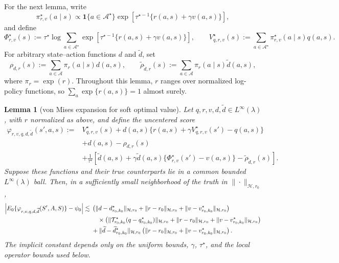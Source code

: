 \documentclass[11pt]{article}
\theoremstyle{plain}
\newtheorem{lemma}[theorem]{Lemma}
\begin{document}
 



For the next lemma, write
\[
\pi_{r,v}^\star(a\mid s)
\propto
\mathbf 1\{a\in\mathcal A^\star\}
\exp\!\left[\tau^{\star-1}\{r(a,s)+\gamma v(a,s)\}\right],
\]
and define
\[
\Phi_{r,v}^\star(s)
:=\tau^\star\log\!\sum_{a\in\mathcal A^\star}
\exp\!\left[\tau^{\star-1}\{r(a,s)+\gamma v(a,s)\}\right],
\qquad
V_{q,r,v}^\star(s)
:=\sum_{a\in\mathcal A^\star}\pi_{r,v}^\star(a\mid s)q(a,s).
\]
For arbitrary state--action functions \(d\) and \(\widetilde d\), set
\[
\rho_{d,r}(s):=\sum_{a\in\mathcal A}\pi_r(a\mid s)d(a,s),
\qquad
\widetilde\rho_{\widetilde d,r}(s)
:=\sum_{a\in\mathcal A}\pi_r(a\mid s)\widetilde d(a,s),
\]
where \(\pi_r=\exp(r)\). Throughout this lemma, \(r\) ranges over normalized
log-policy functions, so \(\sum_a\exp\{r(a,s)\}=1\) almost surely.

\begin{lemma}[von Mises expansion for soft optimal value]
\label{lemma::vonmises_softstar}
Let \(q,r,v,d,\widetilde d\in L^\infty(\lambda)\), with \(r\) normalized as
above, and define the
uncentered score
\begin{align*}
\varphi_{r,v,q,d,\widetilde d}(s',a,s)
:={}&V_{q,r,v}^\star(s)
+d(a,s)\{r(a,s)+\gamma V_{q,r,v}^\star(s')-q(a,s)\}\\
&+d(a,s)-\rho_{d,r}(s)\\
&+\frac{1}{\tau^\star}\left[
\widetilde d(a,s)
+\gamma\widetilde d(a,s)\{\Phi_{r,v}^\star(s')-v(a,s)\}
-\widetilde\rho_{\widetilde d,r}(s)
\right].
\end{align*}
Suppose these functions and their true counterparts lie in a common bounded
\(L^\infty(\lambda)\) ball. Then, in a sufficiently small neighborhood of the
truth in \(\|\cdot\|_{\mathcal H,r_0}\),
\begin{align}
\left|E_0\{\varphi_{r,v,q,d,\widetilde d}(S',A,S)\}-\psi_0\right|
\lesssim{}&
\left(
\|d-d_{r_0,k_0}^\star\|_{\mathcal H,r_0}
+\|r-r_0\|_{\mathcal H,r_0}
+\|v-v_{r_0,k_0}^\star\|_{\mathcal H,r_0}
\right)\notag\\
&\quad\times
\left(
\|\mathcal T_{r_0,k_0}^\star(q-q_{r_0,k_0}^\star)\|_{\mathcal H,r_0}
+\|r-r_0\|_{\mathcal H,r_0}
+\|v-v_{r_0,k_0}^\star\|_{\mathcal H,r_0}
\right)\notag\\
&+
\|\widetilde d-\widetilde d_{r_0,k_0}^\star\|_{\mathcal H,r_0}
\left(
\|r-r_0\|_{\mathcal H,r_0}
+\|v-v_{r_0,k_0}^\star\|_{\mathcal H,r_0}
\right).
\label{eq:softstar-vm-total}
\end{align}
The implicit constant depends only on the uniform bounds, \(\gamma\),
\(\tau^\star\), and the local operator bounds used below.
\end{lemma}
\end{document}

